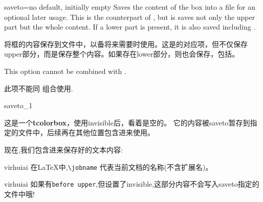 \begin{docTcbKey}[][doc new=2015-05-04]{saveto}{=}{no default, initially empty}
Saves the content of the box into a file for an optional later usage.
This is the counterpart of , but is saves not
only the upper part but the whole content. If a lower part is present,
it is also saved including .


将框的内容保存到文件中，以备将来需要时使用。这是的对应项，但不仅保存upper部分，而是保存整个内容。如果存在lower部分，则也会保存，包括。

\begin{marker}
This option cannot be combined with .

此项不能同  组合使用.
\end{marker}

\begin{exdispExample}{saveto_1}
\begin{tcolorbox}[invisible%
,saveto=\jobname_mysave1.tex
,colback=white
,before upper={before upper}]
这是一个\textbf{tcolorbox}，使用invisible后，看着是空的。
它的内容被saveto暂存到指定的文件中，后续再在其他位置包含进来使用。
\end{tcolorbox}

现在,我们包含进来保存好的文本内容:\\



\end{exdispExample}


\begin{引述之言}{virhuiai}
在LaTeX中,\verb|\jobname| 代表当前文档的名称(不含扩展名)。
\end{引述之言}

\begin{引述之言}{virhuiai}
如果有\verb|before upper|,但设置了invisible,这部分内容不会写入saveto指定的文件中哦!
\end{引述之言}



\end{docTcbKey}
